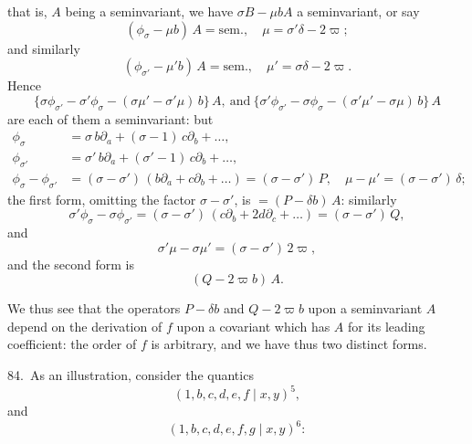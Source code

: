 \documentclass[11pt]{article}
\begin{document}
that is, $A$ being a seminvariant, we have $\sigma B - \mu b A$ a seminvariant, or say
\[
(\phi_\sigma - \mu b)\, A = \mathrm{sem.},\quad \mu = \sigma' \delta - 2\varpi;
\]
and similarly
\[
(\phi_{\sigma'} - \mu' b)\, A = \mathrm{sem.},\quad \mu' = \sigma\delta - 2\varpi.
\]
Hence
\[
\{\sigma\phi_{\sigma'} - \sigma'\phi_\sigma - (\sigma\mu' - \sigma'\mu)\, b\}\, A,\ \text{and}\ \{\sigma'\phi_{\sigma'} - \sigma\phi_\sigma - (\sigma'\mu' - \sigma\mu)\, b\}\, A
\]
are each of them a seminvariant: but
\begin{align*}
\phi_\sigma  &= \sigma\, b\partial_a + (\sigma - 1)\, c\partial_b + \ldots,\\
\phi_{\sigma'} &= \sigma'\, b\partial_a + (\sigma' - 1)\, c\partial_b + \ldots,\\
\phi_\sigma - \phi_{\sigma'} &= (\sigma - \sigma')\,(b\partial_a + c\partial_b + \ldots) = (\sigma - \sigma')\, P,\quad \mu - \mu' = (\sigma - \sigma')\,\delta;
\end{align*}
the first form, omitting the factor $\sigma - \sigma'$, is $= (P - \delta b)\, A$: similarly
\[
\sigma'\phi_\sigma - \sigma\phi_{\sigma'} = (\sigma - \sigma')\,(c\partial_b + 2d\partial_c + \ldots) = (\sigma - \sigma')\, Q,
\]
and
\[
\sigma'\mu - \sigma\mu' = (\sigma - \sigma')\, 2\varpi,
\]
and the second form is
\[
(Q - 2\varpi b)\, A.
\]

We thus see that the operators $P - \delta b$ and $Q - 2\varpi b$ upon a seminvariant $A$ depend on the derivation of $f$ upon a covariant which has $A$ for its leading coefficient: the order of $f$ is arbitrary, and we have thus two distinct forms.

84.\ As an illustration, consider the quantics
\[
(1, b, c, d, e, f \mid x, y)^5,
\]
and
\[
(1, b, c, d, e, f, g \mid x, y)^6:
\]
\end{document}
